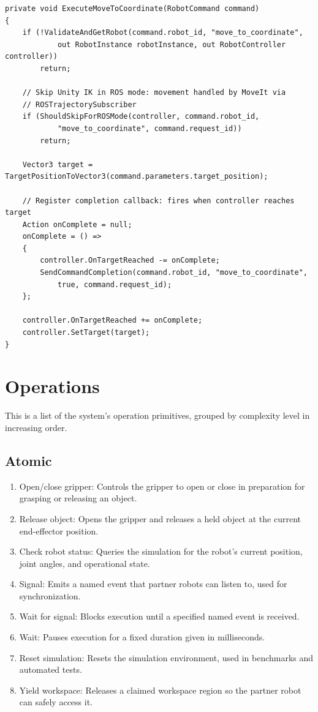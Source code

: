\begin{lstlisting}[caption={Unity C\# implementation processing the command block, asynchronous callback hooks, and IK targeting.}, extendedchars=true]
private void ExecuteMoveToCoordinate(RobotCommand command)
{
    if (!ValidateAndGetRobot(command.robot_id, "move_to_coordinate",
            out RobotInstance robotInstance, out RobotController controller))
        return;

    // Skip Unity IK in ROS mode: movement handled by MoveIt via
    // ROSTrajectorySubscriber
    if (ShouldSkipForROSMode(controller, command.robot_id,
            "move_to_coordinate", command.request_id))
        return;

    Vector3 target = TargetPositionToVector3(command.parameters.target_position);

    // Register completion callback: fires when controller reaches target
    Action onComplete = null;
    onComplete = () =>
    {
        controller.OnTargetReached -= onComplete;
        SendCommandCompletion(command.robot_id, "move_to_coordinate",
            true, command.request_id);
    };

    controller.OnTargetReached += onComplete;
    controller.SetTarget(target);
}
\end{lstlisting}

\section{Operations}
This is a list of the system's operation primitives, grouped by complexity level in increasing order.

\subsection{Atomic}
\begin{enumerate}
	\item Open/close gripper: Controls the gripper to open or close in preparation for grasping or releasing an object.
	\item Release object: Opens the gripper and releases a held object at the current end-effector position.
	\item Check robot status: Queries the simulation for the robot's current position, joint angles, and operational state.
	\item Signal: Emits a named event that partner robots can listen to, used for synchronization.
	\item Wait for signal: Blocks execution until a specified named event is received.
	\item Wait: Pauses execution for a fixed duration given in milliseconds.
	\item Reset simulation: Resets the simulation environment, used in benchmarks and automated tests.
	\item Yield workspace: Releases a claimed workspace region so the partner robot can safely access it.
\end{enumerate}

